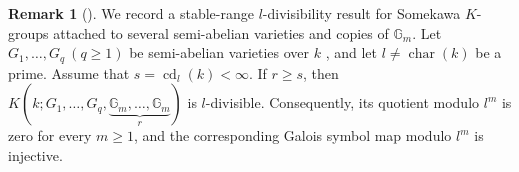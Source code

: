 \documentclass[a4paper,12pt]{amsart}
\numberwithin{equation}{section}
\theoremstyle{definition}
\newtheorem{rem}[rem]{Remark}
\newcommand{\Char}{\operatorname{char}}
\newcommand{\Cor}{\operatorname{Cor}}
\newcommand{\Gm}{\mathbb{G}_{m}}
\newcommand{\et}{\mathrm{\acute et}}
\newcommand{\Het}{H_{\mathrm{\acute et}}}
\newcommand{\cd}{\operatorname{cd}}
\begin{document}





\begin{rem}[]\label{prop:div}
We record a stable-range $l$-divisibility result for Somekawa $K$-groups attached to several semi-abelian varieties and copies of $\Gm$.
Let $G_1,\ldots, G_q\ (q\ge 1)$ be semi-abelian varieties over $k$%
, and let
$l\neq\Char(k)$ be a prime.  Assume that
$s=\cd_l(k)<\infty$.  If $r\ge s$, then
$K(k;G_1,\ldots,G_q,
 \underbrace{\Gm,\ldots,\Gm}_{r})$
is $l$-divisible.  Consequently, its quotient modulo $l^m$ is zero
for every $m\geq1$, and the corresponding Galois symbol map modulo
$l^m$ is injective.
\end{rem}
\end{document}
